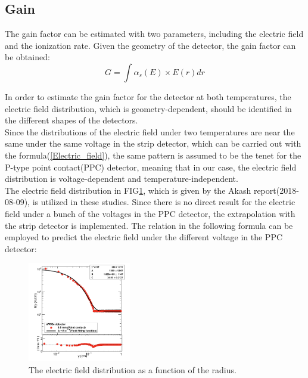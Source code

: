 \documentclass[%
 reprint,
 amsmath,amssymb,
 aps,
]{revtex4-2}
\begin{document}
\subsection{Gain}
The gain factor can be estimated with two parameters, including the electric field and the ionization rate. Given the geometry of the detector, the gain factor can be obtained:\\
\begin{equation}
G = \int \alpha_{s}(E) \times E(r) dr
\end{equation}

In order to estimate the gain factor for the detector at both temperatures, the electric field distribution, which is geometry-dependent, should be identified in the different shapes of the detectors.\\

Since the distributions of the electric field under two temperatures are near the same under the same voltage in the strip detector, which can be carried out with the formula(\ref{Electric_field}), the same pattern is assumed to be the tenet for the P-type point contact(PPC) detector, meaning that in our case, the electric field distribution is voltage-dependent and temperature-independent.\\ 

The electric field distribution in FIG\ref{Electric_Field_PPC}, which is given by the Akash report(2018-08-09), is utilized in these studies. Since there is no direct result for the electric field under a bunch of the voltages in the PPC detector, the extrapolation with the strip detector is implemented. The relation in the following formula can be employed to predict the electric field under the different voltage in the PPC detector: \\

\begin{figure}[h]
  \centering
  \includegraphics[width=0.4\textwidth]{Electric_Field_PPC.png}
  \caption{The electric field distribution as a function of the radius.}
  \label{Electric_Field_PPC}
\end{figure}
\end{document}
